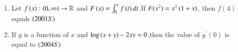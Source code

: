 \documentclass[journal,12pt,onecolumn]{IEEEtran}
\theoremstyle{remark}
\begin{document}
\begin{enumerate}
\begin{enumerate}
\end{enumerate}
\item Let $f\left(x\right):\left(0,\infty\right)\rightarrow \mathbb{R}$ and $F\left(x\right)=\int_{0}^x f\left(t\right)dt$.If $F(x^2)=x^2\left(1+x\right)$, then $f(4)$ equals $\hfill\brak{2001S}$
\begin{enumerate}
\end{enumerate}
\item If $y$ is a function of $x$ and $\log{\ensuremath{\left(x+y\right)}}-2xy=0$,then the value of $y^{\prime}(0)$ is equal to $\hfill\brak{2004S}$
\begin{enumerate}

\end{enumerate}
\end{enumerate}
\end{document}

